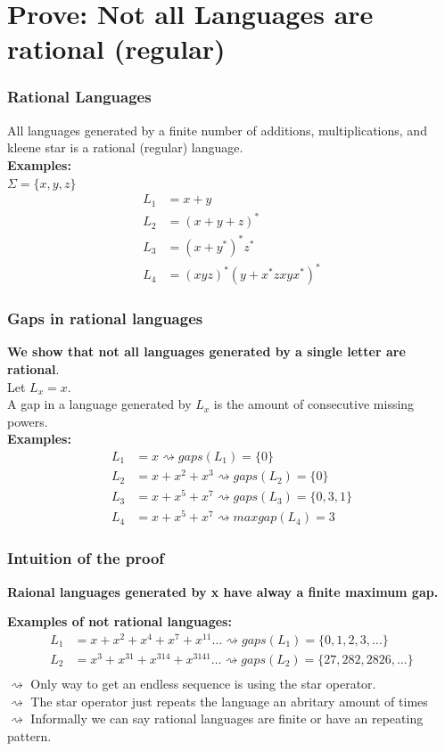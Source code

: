 \documentclass{beamer}
\begin{document}
\section{Prove: Not all Languages are rational (regular)}
\begin{frame}
  \frametitle{Rational Languages}
  All languages generated by a finite number of additions, multiplications, 
  and kleene star is a rational (regular) language.\\
  {\bf Examples:}\\
  $\Sigma = \{x, y, z\}$ 
  \begin{align}
    L_1 &= x+y \\
    L_2 &=(x+y+z)^* \\
    L_3 &= (x+y^*)^*z^*\\
    L_4 &=(xyz)^*(y+x^*zxyx^*)^*
  \end{align}
\end{frame}
\begin{frame}
  \frametitle{Gaps in rational languages}
  {\bf We show that not all languages generated 
  by a single letter are rational}.\\
  Let $L_x = x$.\\
  A gap in a language generated by $L_x$ is the
  amount of consecutive missing powers.\\
  {\bf Examples:}\\
  \begin{align*}
    L_1 &= x \rightsquigarrow gaps(L_1) = \{0\} \\ 
    L_2 &= x + x^2 + x^3 \rightsquigarrow gaps(L_2) = \{0\} \\
    L_3 &= x + x^5 + x^7 \rightsquigarrow gaps(L_3) = \{0,3,1\} \\
    L_4 &= x + x^5 + x^7 \rightsquigarrow maxgap(L_4) = 3
  \end{align*}
\end{frame}
\begin{frame}
  \frametitle{Intuition of the proof}
  {\bf Raional languages generated by x have alway a finite maximum gap.}
  
  {\bf Examples of not rational languages:}\\
  \begin{align*}
    L_1 &= x + x^2 + x^4 + x^7 + x^{11} 
    \dots \rightsquigarrow gaps(L_1) = \{0,1,2,3, \dots\} \\ 
    L_2 &= x^3 + x^{31} + x^{314} + x^{3141} \dots
    \rightsquigarrow gaps(L_2) = \{27, 282, 2826, \dots\} \\
  \end{align*}
  $\rightsquigarrow$ Only way to get an endless sequence is
    using the star operator.\\
  $\rightsquigarrow$ The star operator just repeats the language
  an abritary amount of times\\
  $\rightsquigarrow$ Informally we can say rational languages are finite or have an repeating pattern.
\end{frame}
\end{document}
